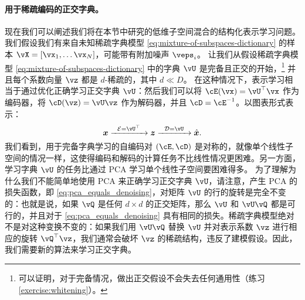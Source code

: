 \documentclass[../../book-main.tex]{subfiles}
\begin{document}

\paragraph{用于稀疏编码的正交字典。}
现在我们可以阐述我们将在本节中研究的低维子空间混合的结构化表示学习问题。
我们假设我们有来自未知稀疏字典模型 \eqref{eq:mixture-of-subspaces-dictionary} 的样本 $\vX = [\vx_1, \dots \vx_N]$，可能带有附加噪声 $\veps_i$。
让我们从假设稀疏字典模型 \eqref{eq:mixture-of-subspaces-dictionary} 中的字典 $\vU$ 是完备且正交的开始，\footnote{可以证明，对于完备情况，做出正交假设不会失去任何通用性（练习 \ref{exercise:whitening}）。} 并且每个系数向量 $\vz$ 都是 $d$-稀疏的，其中 $d \ll D$。
在这种情况下，表示学习相当于{通过优化正确学习正交字典 $\vU$}：然后我们可以将 $\cE(\vx) = \vU^\top \vx$ 作为编码器，将 $\cD(\vz) = \vU \vz$ 作为解码器，并且 $\cD = \cE^{-1}$。以图表形式表示：
\begin{equation}
\x \xrightarrow{\hspace{2mm} \mathcal{E} = \vU^\top \hspace{2mm}}  \z \xrightarrow{\hspace{2mm} \mathcal{D} = \vU \hspace{2mm}}   \hat{\x}.  
\label{eqn:autoencoding-DL}
\end{equation}    
我们看到，用于完备字典学习的自编码对 $(\cE, \cD)$ 是对称的，就像单个线性子空间的情况一样，这使得编码和解码的计算任务不比线性情况更困难。另一方面，学习字典 $\vU$ 的任务比通过 PCA 学习单个线性子空间要困难得多。
为了理解为什么我们不能简单地使用 PCA 来正确学习正交字典 $\vU$，请注意，产生 PCA 的损失函数，即 \eqref{eq:pca_equals_denoising}，对矩阵 $\vU$ 的行的旋转是完全不变的：也就是说，如果 $\vQ$ 是任何 $d \times d$ 的正交矩阵，那么 $\vU$ 和 $\vU \vQ$ 都是可行的，并且对于 \eqref{eq:pca_equals_denoising} 具有相同的损失。稀疏字典模型绝对不是对这种变换不变的：如果我们用 $\vU \vQ$ 替换 $\vU$ 并对表示系数 $\vz$ 进行相应的旋转 $\vQ^\top \vz$，我们通常会破坏 $\vz$ 的稀疏结构，违反了建模假设。因此，我们需要新的算法来学习正交字典。
\end{document}
